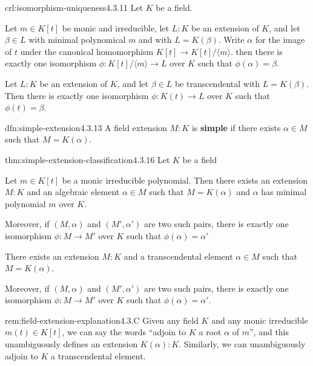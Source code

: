 \documentclass[landscape, 8pt]{extarticle}
\begin{document}
\begin{multicols}{3}
\begin{crl}{crl:isomorphism-uniqueness}{4.3.11}
    Let $K$ be a field.
    \begin{enumerate-tight}
        \item Let $m\in K[t]$ be monic and irreducible, let $L : K$ be an extension of $K$, and let $\beta\in L$ with minimal polynomical $m$ and with $L = K(\beta)$. Write $\alpha$ for the image of $t$ under the canonical homomorphism $K[t] \to K[t] / \langle m \rangle$. then there is exactly one isomorphism $\phi : K[t] / \langle m \rangle \to L$ over $K $ such that $\phi(\alpha) = \beta$.
        \item Let $L : K$ be an extension of $K$, and let $\beta \in L$ be transcendental with $L = K(\beta)$. Then there is exactly one isomorphism $\phi : K(t) \to L$ over $K$ such that $\phi(t) = \beta$.
    \end{enumerate-tight}
\end{crl}

\begin{dfn}{dfn:simple-extension}{4.3.13}
    A field extension $M : K$ is \textbf{simple} if there exists $\alpha \in M$ such that $M = K(\alpha)$.
\end{dfn}

\begin{thm}{thm:simple-extension-classification}{4.3.16}
    Let $K$ be a field
    \begin{enumerate-tight}
        \item Let $m\in K[t]$ be a monic irreducible polynomial. Then there exists an extension $M : K$ and an algebraic element $\alpha\in M$ such that $M = K(\alpha)$ and $\alpha$ has minimal polynomial $m$ over $K$. 

            Moreover, if $(M, \alpha)$ and $(M',\alpha')$ are two such pairs, there is exactly one isomorphism $\phi : M \to M'$ over $K$ such that $\phi(\alpha) = \alpha'$
        \item There exists an extension $M : K$ and a transcendental element $\alpha \in M$ such that $M = K(\alpha)$.

            Moreover, if $(M, \alpha)$ and $(M',\alpha')$ are two such pairs, there is exactly one isomorphism $\phi : M \to M'$ over $K$ such that $\phi(\alpha) = \alpha'$.
    \end{enumerate-tight}
\end{thm}

\begin{rem}{rem:field-extension-explanation}{4.3.C}
    Given any field $K$ and any monic irreducible $m(t) \in K[t]$, we can say the words ``adjoin to $K$ a root $\alpha$ of $m$'', and this unambiguously defines an extension $K(\alpha) : K$. Similarly, we can unambiguously adjoin to $K$ a transcendental element.
\end{rem}


\end{multicols}
\end{document}
